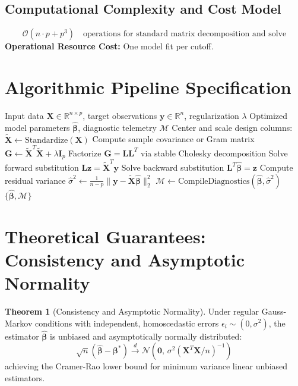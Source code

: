 \documentclass[11pt,a4paper]{article}
\theoremstyle{definition}
\newtheorem{theorem}{\textbf{Theorem}}[section]
\begin{document}
\subsection{Computational Complexity and Cost Model}
\begin{equation}
\mathcal{O}(n \cdot p + p^3) \quad \text{operations for standard matrix decomposition and solve}
\end{equation}
\textbf{Operational Resource Cost:} One model fit per cutoff.

\section{Algorithmic Pipeline Specification}

\begin{algorithm}[H]
\caption{Time-series cross-validation Execution}
\begin{algorithmic}[1]
\Require Input data $\mathbf{X} \in \mathbb{R}^{n \times p}$, target observations $\mathbf{y} \in \mathbb{R}^n$, regularization $\lambda$
\Ensure Optimized model parameters $\hat{\boldsymbol{\beta}}$, diagnostic telemetry $\mathcal{M}$
\State Center and scale design columns: $\tilde{\mathbf{X}} \gets \text{Standardize}(\mathbf{X})$
\State Compute sample covariance or Gram matrix $\mathbf{G} \gets \tilde{\mathbf{X}}^T \tilde{\mathbf{X}} + \lambda \mathbf{I}_p$
\State Factorize $\mathbf{G} = \mathbf{L} \mathbf{L}^T$ via stable Cholesky decomposition
\State Solve forward substitution $\mathbf{L} \mathbf{z} = \tilde{\mathbf{X}}^T \mathbf{y}$
\State Solve backward substitution $\mathbf{L}^T \hat{\boldsymbol{\beta}} = \mathbf{z}$
\State Compute residual variance $\hat{\sigma}^2 \gets \frac{1}{n - p} \| \mathbf{y} - \tilde{\mathbf{X}} \hat{\boldsymbol{\beta}} \|_2^2$
\State $\mathcal{M} \gets \text{CompileDiagnostics}(\hat{\boldsymbol{\beta}}, \hat{\sigma}^2)$
\State \Return $\{\hat{\boldsymbol{\beta}}, \mathcal{M}\}$
\end{algorithmic}
\end{algorithm}

\section{Theoretical Guarantees: Consistency and Asymptotic Normality}

\begin{theorem}[Consistency and Asymptotic Normality]
Under regular Gauss-Markov conditions with independent, homoscedastic errors $\epsilon_i \sim (0, \sigma^2)$, the estimator $\hat{\boldsymbol{\beta}}$ is unbiased and asymptotically normally distributed:
\begin{equation}
\sqrt{n}(\hat{\boldsymbol{\beta}} - \boldsymbol{\beta}^*) \xrightarrow{d} \mathcal{N}\left(\mathbf{0}, \, \sigma^2 (\mathbf{X}^T \mathbf{X} / n)^{-1}\right)
\end{equation}
achieving the Cramer-Rao lower bound for minimum variance linear unbiased estimators.
\end{theorem}
\end{document}
